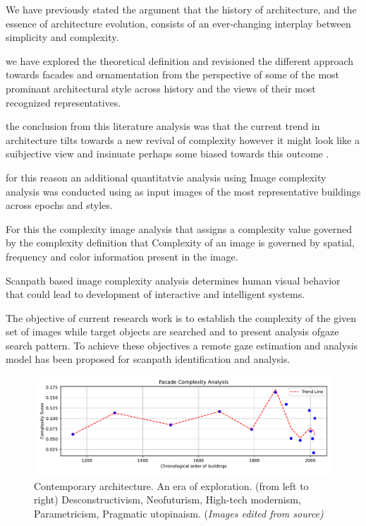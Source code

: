 %    

We have previously stated the argument that the history of architecture, and the essence of architecture evolution, consists of an ever-changing interplay between simplicity and complexity.

we have explored the theoretical definition and revisioned the different approach towards facades and ornamentation from the perspective of some of the most prominant architectural style across history and the views of their most recognized representatives.

the conclusion from this literature analysis was that the current trend in architecture tilts towards a new revival of complexity however it might look like a suibjective view and insinuate perhaps some biased towards this outcome .

for this reason an additional quantitatvie analysis using Image complexity analysis was conducted using as input images of the most representative buildings across epochs and styles.

For this the complexity image analysis that assigns a complexity value governed by the complexity definition that Complexity of an image is governed by spatial, frequency and color information present in the image.

Scanpath based image complexity analysis determines human visual behavior that could lead to development of interactive and intelligent systems.\cite{Ishrat2020}

The objective of current research work is to establish the complexity of the given set of images while target objects are searched and to present analysis ofgaze search pattern.
To achieve these objectives a remote gaze estimation and analysis model has been proposed for scanpath identification and analysis.\cite{Ishrat2020}

     \begin{figure}[htb]
          \centering
          \includegraphics[width= \linewidth]{Graphs/complexitygraph}
          \caption{Contemporary architecture. An era of exploration. (from left to right) Desconstructivism, Neofuturism, High-tech modernism, Parametricism, Pragmatic utopinaism.  (\textit{Images edited from source)}}
          \label{fig:complexitygraph}
        \end{figure}


